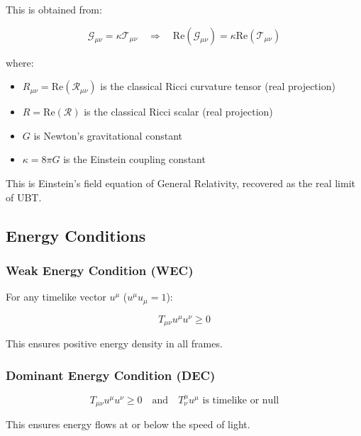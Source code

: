 This is obtained from:

\begin{equation}
\mathcal{G}_{\mu\nu} = \kappa \mathcal{T}_{\mu\nu} \quad \Rightarrow \quad \text{Re}(\mathcal{G}_{\mu\nu}) = \kappa \text{Re}(\mathcal{T}_{\mu\nu})
\end{equation}

where:
\begin{itemize}
    \item $R_{\mu\nu} = \text{Re}(\mathcal{R}_{\mu\nu})$ is the classical Ricci curvature tensor (real projection)
    \item $R = \text{Re}(\mathcal{R})$ is the classical Ricci scalar (real projection)
    \item $G$ is Newton's gravitational constant
    \item $\kappa = 8\pi G$ is the Einstein coupling constant
\end{itemize}

This is Einstein's field equation of General Relativity, recovered as the real limit of UBT.

\subsection{Energy Conditions}

\subsubsection{Weak Energy Condition (WEC)}

For any timelike vector $u^\mu$ ($u^\mu u_\mu = 1$):

\begin{equation}
\label{eq:canonical:wec}
T_{\mu\nu} u^\mu u^\nu \geq 0
\end{equation}

This ensures positive energy density in all frames.

\subsubsection{Dominant Energy Condition (DEC)}

\begin{equation}
\label{eq:canonical:dec}
T_{\mu\nu} u^\mu u^\nu \geq 0 \quad \text{and} \quad T^\mu_\nu u^\mu \text{ is timelike or null}
\end{equation}

This ensures energy flows at or below the speed of light.

